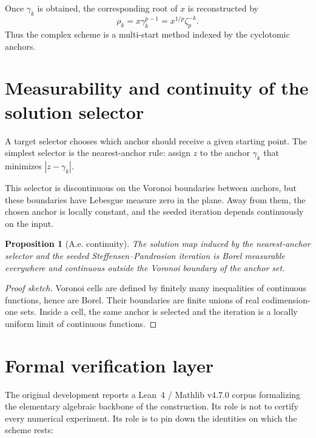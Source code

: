 \documentclass[11pt,a4paper]{article}
\theoremstyle{plain}
\newtheorem{proposition}[theorem]{Proposition}
\theoremstyle{definition}
\theoremstyle{remark}
\begin{document}
Once $\gamma_k$ is obtained, the corresponding root of $x$ is reconstructed by
\[
  \rho_k=x\gamma_k^{p-1}=x^{1/p}\zeta_p^{-k}.
\]
Thus the complex scheme is a multi-start method indexed by the cyclotomic
anchors.

\section{Measurability and continuity of the solution selector}
\label{sec:measurability}

A target selector chooses which anchor should receive a given starting point.
The simplest selector is the nearest-anchor rule: assign $z$ to the anchor
$\gamma_k$ that minimizes $|z-\gamma_k|$.

This selector is discontinuous on the Voronoi boundaries between anchors, but
these boundaries have Lebesgue measure zero in the plane.  Away from them, the
chosen anchor is locally constant, and the seeded iteration depends
continuously on the input.

\begin{proposition}[A.e. continuity]
The solution map induced by the nearest-anchor selector and the seeded
Steffensen--Pandrosion iteration is Borel measurable everywhere and continuous
outside the Voronoi boundary of the anchor set.
\end{proposition}

\begin{proof}[Proof sketch]
Voronoi cells are defined by finitely many inequalities of continuous
functions, hence are Borel.  Their boundaries are finite unions of real
codimension-one sets.  Inside a cell, the same anchor is selected and the
iteration is a locally uniform limit of continuous functions.
\end{proof}

\section{Formal verification layer}
\label{sec:lean}

The original development reports a Lean~4 / Mathlib v4.7.0 corpus formalizing
the elementary algebraic backbone of the construction.  Its role is not to
certify every numerical experiment.  Its role is to pin down the identities on
which the scheme rests:
\end{document}
